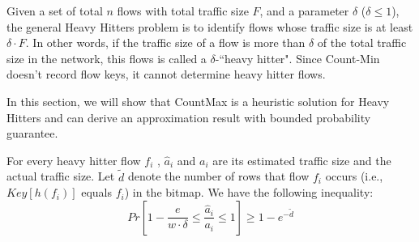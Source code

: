 Given a set of total $n$ flows with total traffic size $F$, and a parameter $\delta$ ($\delta \le 1$), the general Heavy Hitters problem is to identify flows whose traffic size is at least $\delta\cdot F$. In other words, if the traffic size of a flow is more than $\delta $ of the total traffic size in the network, this flows is called a $\delta$-``heavy hitter". Since Count-Min doesn't record flow keys, it cannot determine heavy hitter flows.


In this section, we will show that CountMax is a heuristic solution for Heavy Hitters and can derive an approximation result with bounded probability guarantee.

\begin{theorem}
	\label{tm:query}
	For every heavy hitter flow $f_i$ , $\hat{a}_i$ and $a_i$ are its estimated traffic size and the actual traffic size. Let $\tilde{d}$ denote the number of rows that flow $f_i$ occurs (i.e., $Key[h(f_i)] $ equals $f_i$) in the bitmap. We have the following inequality:
	\begin{equation}
	\label{eq:hhacc}
	Pr[1-\frac{e}{w\cdot \delta}\le \frac{\hat{a}_i}{a_i} \le 1] \ge 1-e^{-\tilde{d}}
	\end{equation}
\end{theorem}

